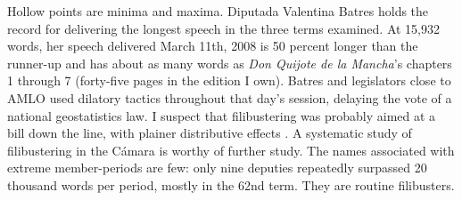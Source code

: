 \documentclass[letter,12pt]{article}
\begin{document}
Hollow points are minima and maxima. Diputada Valentina Batres holds the record for delivering the longest speech in the three terms examined. At 15,932 words, her speech delivered March 11th, 2008 is 50 percent longer than the runner-up and has about as many words as \emph{Don Quijote de la Mancha}'s chapters 1 through 7 (forty-five pages in the edition I own). Batres and legislators close to AMLO used dilatory tactics throughout that day's session, delaying the vote of a national geostatistics law. I suspect that filibustering was probably aimed at a bill down the line, with plainer distributive effects \citep[cf.][]{wawro.schickler.filibuster.2007}. A systematic study of filibustering in the Cámara is worthy of further study. The names associated with extreme member-periods are few: only nine deputies repeatedly surpassed 20 thousand words per period, mostly in the 62nd term. They are routine filibusters.





\end{document}
